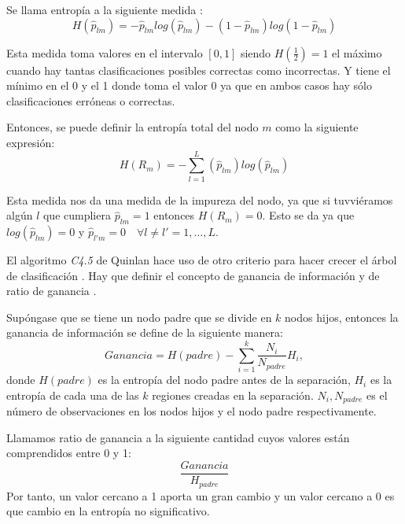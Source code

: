 \begin{defi}
Se llama entropía a la siguiente medida :
\begin{equation}
H(\hat{p}_{lm})=-\hat{p}_{lm}log(\hat{p}_{lm})-(1-\hat{p}_{lm})log(1-\hat{p}_{lm})
\end{equation}

\noindent Esta medida toma valores en el intervalo $[0,1]$ siendo $H(\frac{1}{2})=1$ el máximo cuando hay tantas clasificaciones posibles correctas como incorrectas. Y tiene el mínimo en el 0 y el 1 donde toma el valor 0 ya que en ambos casos hay sólo clasificaciones erróneas o correctas.

\noindent Entonces, se puede definir la entropía total del nodo $m$ como la siguiente expresión:
\begin{equation}
H(R_m)=-\sum_{l=1}^L(\hat{p}_{lm})log(\hat{p}_{lm})
\end{equation}

\noindent Esta medida nos da una medida de la impureza del nodo, ya que si tuvviéramos algún $l$ que cumpliera $\hat{p}_{lm}=1$ entonces $H(R_m)=0$. Esto se da ya que $log(\hat{p}_{lm})=0$ y $\hat{p}_{l'm}=0 \quad \forall l\neq l' =1,\ldots, L$.
\end{defi}

\noindent El algoritmo \emph{C4.5} de Quinlan   hace uso de otro criterio para hacer crecer el árbol de clasificación \cite{Quinlan 2014}. Hay que definir el concepto de ganancia de información y de ratio de ganancia \cite{Brown 2004}.

\begin{defi}
Supóngase que se tiene un nodo padre que se divide en $k$ nodos hijos, entonces la  ganancia de información se define de la siguiente manera: 
\begin{equation}
Ganancia=H(padre)-\sum_{i=1}^k \dfrac{N_i}{N_{padre}}H_i,
\end{equation}
\noindent donde $H(padre)$ es la entropía del nodo padre antes de la separación,  $H_i$ es la entropía de cada una de las $k$  regiones creadas en la separación. $N_i, N_{padre}$ es el número de observaciones en  los nodos hijos y el nodo padre respectivamente. 
\end{defi}

\begin{defi}
Llamamos ratio de ganancia a la siguiente cantidad cuyos valores están comprendidos entre 0 y 1:
\begin{equation}
\dfrac{Ganancia}{H_{padre}}
\end{equation}
Por tanto, un valor cercano a 1 aporta un gran cambio y un valor cercano a 0 es que  cambio en la entropía no significativo.   
\end{defi}


